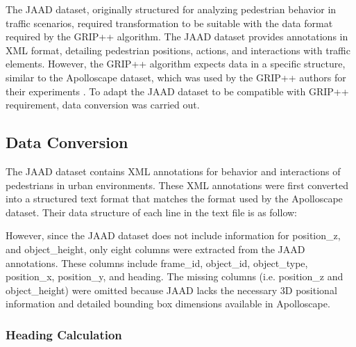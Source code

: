 \tab The JAAD dataset, originally structured for analyzing pedestrian behavior in traffic scenarios, required transformation to be suitable with the data format required by the GRIP++ algorithm. The JAAD dataset provides annotations in XML format, detailing pedestrian positions, actions, and interactions with traffic elements. However, the GRIP++ algorithm expects data in a specific structure, similar to the Apolloscape dataset, which was used by the GRIP++ authors for their experiments \cite{li2020gripplus}. To adapt the JAAD dataset to be compatible with GRIP++ requirement, data conversion was carried out. 

\subsection{Data Conversion}

\tab The JAAD dataset contains XML annotations for behavior and interactions of pedestrians in urban environments. These XML annotations were first converted into a structured text format that matches the format used by the Apolloscape dataset. Their data structure of each line in the text file is as follow:

\begin{table}[h!]
\centering
{}
\caption{Data Structure of ApolloScape Dataset \cite{ma2019trafficpredict}}
\end{table}

However, since the JAAD dataset does not include information for position\_z, and object\_height, only eight columns were extracted from the JAAD annotations. These columns include frame\_id, object\_id, object\_type, position\_x, position\_y, and heading. The missing columns (i.e. position\_z and object\_height) were omitted because JAAD lacks the necessary 3D positional information and detailed bounding box dimensions available in Apolloscape.

\subsubsection{Heading Calculation}

